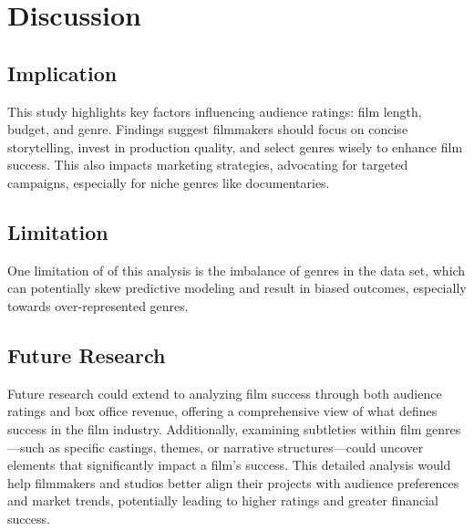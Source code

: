 \documentclass[
  11pt,
]{article}
\begin{document}
\hypertarget{discussion}{%
\section{Discussion}\label{discussion}}

\hypertarget{implication}{%
\subsection{Implication}\label{implication}}

This study highlights key factors influencing audience ratings: film
length, budget, and genre. Findings suggest filmmakers should focus on
concise storytelling, invest in production quality, and select genres
wisely to enhance film success. This also impacts marketing strategies,
advocating for targeted campaigns, especially for niche genres like
documentaries.

\hypertarget{limitation}{%
\subsection{Limitation}\label{limitation}}

One limitation of of this analysis is the imbalance of genres in the
data set, which can potentially skew predictive modeling and result in
biased outcomes, especially towards over-represented genres.

\hypertarget{future-research}{%
\subsection{Future Research}\label{future-research}}

Future research could extend to analyzing film success through both
audience ratings and box office revenue, offering a comprehensive view
of what defines success in the film industry. Additionally, examining
subtleties within film genres---such as specific castings, themes, or
narrative structures---could uncover elements that significantly impact
a film's success. This detailed analysis would help filmmakers and
studios better align their projects with audience preferences and market
trends, potentially leading to higher ratings and greater financial
success.
\end{document}
